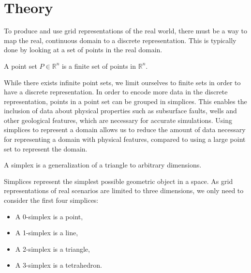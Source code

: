 \section{Theory}
To produce and use grid representations of the real world, there must be a way to map the real, continuous domain to a discrete representation. This is typically done by looking at a set of points in the real domain.

\begin{definition}
A point set $P \in \mathbb{R}^n$ is a finite set of points in $\mathbb{R}^n$.
\end{definition}
While there exists infinite point sets, we limit ourselves to finite sets in order to have a discrete representation. In order to encode more data in the discrete representation, points in a point set can be grouped in simplices. This enables the inclusion of data about physical properties such as subsurface faults, wells and other geological features, which are necessary for accurate simulations. Using simplices to represent a domain allows us to reduce the amount of data necessary for representing a domain with physical features, compared to using a large point set to represent the domain.


\begin{definition}[Simplex]
A simplex is a generalization of a triangle to arbitrary dimensions.
\end{definition}
Simplices represent the simplest possible geometric object in a space. As grid representations of real scenarios are limited to three dimensions, we only need to consider the first four simplices:
\begin{itemize}
    \item A 0-simplex is a point,
    \item A 1-simplex is a line,
    \item A 2-simplex is a triangle,
    \item A 3-simplex is a tetrahedron.
\end{itemize}

